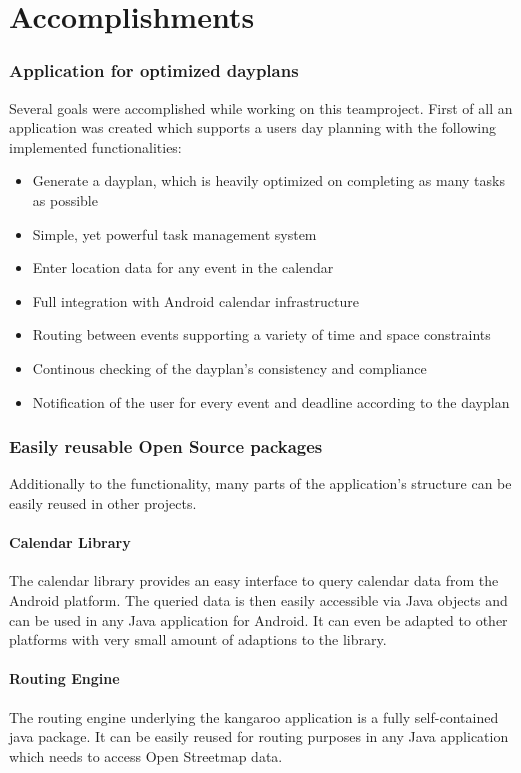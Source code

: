\section{Accomplishments}
\label{sec:accomplishments}
\subsubsection{Application for optimized dayplans} %
\label{ssub:Application for optimized dayplans}
Several goals were accomplished while working on this teamproject. First of all
an application was created which supports a users day planning with the
following implemented functionalities:
\begin{itemize}
  \item Generate a dayplan, which is heavily optimized on completing as many
    tasks as possible
  \item Simple, yet powerful task management system
  \item Enter location data for any event in the calendar
  \item Full integration with Android calendar infrastructure
  \item Routing between events supporting a variety of time and space
    constraints
  \item Continous checking of the dayplan's consistency and compliance
  \item Notification of the user for every event and deadline according to the
    dayplan
\end{itemize}


\subsubsection{Easily reusable Open Source packages} %
\label{ssub:Easily reusable Open Source packages}
Additionally to the functionality, many parts of the application's structure can
be easily reused in other projects.

\paragraph{Calendar Library}
The calendar library provides an easy interface to query calendar data from the
Android platform. The queried data is then easily accessible via Java objects
and can be used in any Java application for Android. It can even be adapted to
other platforms with very small amount of adaptions to the library.

\paragraph{Routing Engine}
The routing engine underlying the kangaroo application is a fully self-contained
java package. It can be easily reused for routing purposes in any Java
application which needs to access Open Streetmap data.


